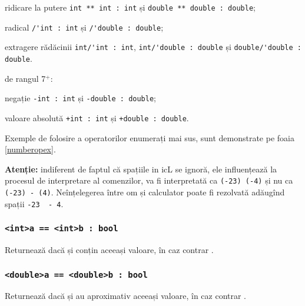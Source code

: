 \begin{icItems}
\begin{icItems}
				ridicare la putere \lstinline|int ** int : int| și \lstinline|double ** double : double|;
			\item
				radical \lstinline|/'int : int| și \lstinline|/'double : double|;
			\item
				extragere rădăcinii \lstinline|int/'int : int|, \lstinline|int/'double : double| și \lstinline|double/'double : double|.
		\end{icItems}
	\item
		de rangul 7$^+$:
		\begin{icItems}
			\item
				negație \lstinline|-int : int| și \lstinline|-double : double|;
			\item
				valoare absolută \lstinline|+int : int| și \lstinline|+double : double|.
		\end{icItems}
\end{icItems}

Exemple de folosire a operatorilor enumerați mai sus, sunt demonstrate pe foaia \ref{numberopex}.

{\bf Atenție:} indiferent de faptul că spațiile in icL se ignoră, ele influențează la procesul de interpretare al comenzilor,  va fi interpretată ca \lstinline|(-23) (-4)| și nu ca \lstinline|(-23) - (4)|. Neînțelegerea între om și calculator poate fi rezolvată adăugînd spații \lstinline|-23  - 4|.

\subsubsection{\lstinline|<int>a == <int>b : bool|}

Returnează \true{} dacă  și  conțin aceeași valoare, în caz contrar \false{}.

\subsubsection{\lstinline|<double>a == <double>b : bool|}

Returnează \true{} dacă  și  au aproximativ aceeași valoare, în caz contrar \false{}.

